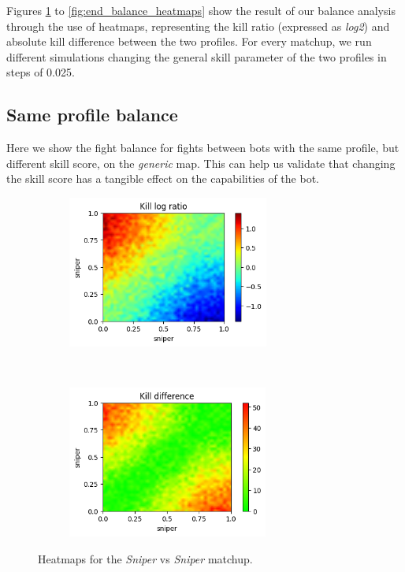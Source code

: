 Figures \ref{fig:begin_balance_heatmaps} to \ref{fig:end_balance_heatmaps} show the result of our balance analysis through the use of heatmaps, representing the kill ratio (expressed as \textit{log2}) and absolute kill difference between the two profiles. 
For every matchup, we run different simulations changing the general skill parameter of the two profiles in steps of 0.025.

\subsection{Same profile balance}
Here we show the fight balance for fights between bots with the same profile, but different skill score, on the \textit{generic} map. This can help us validate that changing the skill score has a tangible effect on the capabilities of the bot.

\begin{figure}[H]
    \centering
    \begin{subfigure}[t]{0.5\textwidth}
        \centering
        \includegraphics[height=5cm]{Images/images/heatmaps/same-profile/sniper_heatmap_ratio.png}
    \end{subfigure}%
    ~ 
    \begin{subfigure}[t]{0.5\textwidth}
        \centering
        \includegraphics[height=5cm]{Images/images/heatmaps/same-profile/sniper_heatmap_diff.png}
    \end{subfigure}
    \caption{Heatmaps for the \textit{Sniper} vs \textit{Sniper} matchup.}
    \label{fig:balance_sniper_sniper}
    \label{fig:begin_balance_heatmaps}
\end{figure}

